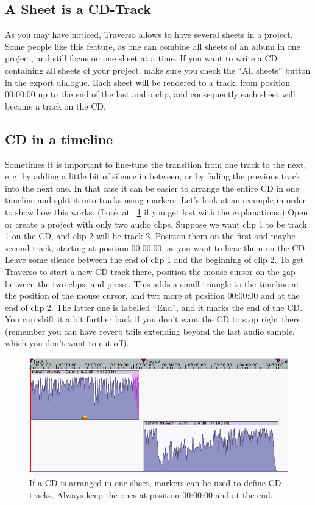 \subsection{A Sheet is a CD-Track}
As you may have noticed, Traverso allows to have several sheets in a project. Some people like this feature, as one can combine all sheets of an album in one project, and still focus on one sheet at a time. If you want to write a CD containing all sheets of your project, make sure you check the ``All sheets'' button in the export dialogue. Each sheet will be rendered to a track, from position 00:00:00 up to the end of the last audio clip, and consequently each sheet will become a track on the CD.

\subsection{CD in a timeline}
Sometimes it is important to fine-tune the transition from one track to the next, e.\,g. by adding a little bit of silence in between, or by fading the previous track into the next one. In that case it can be easier to arrange the entire CD in one timeline and split it into tracks using markers. Let's look at an example in order to show how this works. (Look at \FigT~\ref{fig_markers01} if you get lost with the explanations.) Open or create a project with only two audio clips. Suppose we want clip 1 to be track 1 on the CD, and clip 2 will be track 2. Position them on the first and maybe second track, starting at position 00:00:00, as you want to hear them on the CD. Leave some silence between the end of clip 1 and the beginning of clip 2. To get Traverso to start a new CD track there, position the mouse cursor on the gap between the two clips, and press . This adds a small triangle to the timeline at the position of the mouse cursor, and two more at position 00:00:00 and at the end of clip 2. The latter one is labelled ``End'', and it marks the end of the CD. You can shift it a bit further back if you don't want the CD to stop right there (remember you  can have reverb tails extending beyond the last audio sample, which you don't want to cut off).

\begin{figure}[t]
 \centering\includegraphics[width=\textwidth]{images/markers01}
 \caption{If a CD is arranged in one sheet, markers can be used to define CD tracks. Always keep the ones at position 00:00:00 and at the end.}
 \label{fig_markers01}
\end{figure}

